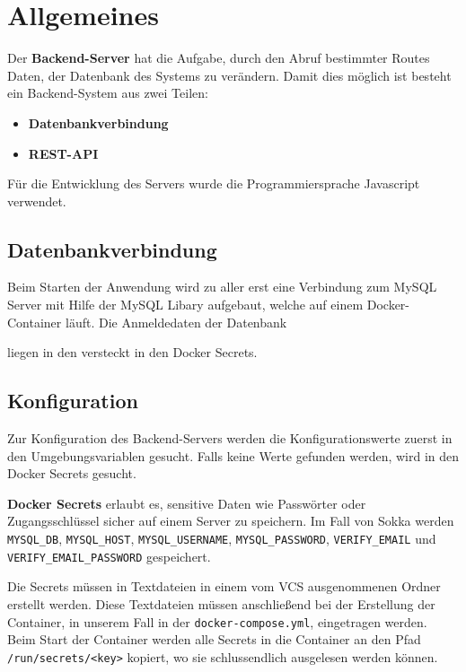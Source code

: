 \chapter{Allgemeines}

Der \textbf{Backend-Server} hat die Aufgabe, durch den Abruf bestimmter Routes Daten, der Datenbank des Systems zu verändern. Damit dies möglich ist besteht ein Backend-System aus zwei Teilen:

\begin{itemize}
    \item \textbf{Datenbankverbindung}
    \item \textbf{REST-API}
\end{itemize}

Für die Entwicklung des Servers wurde die Programmiersprache Javascript verwendet.

\section{Datenbankverbindung}

Beim Starten der Anwendung wird zu aller erst eine Verbindung zum MySQL Server mit Hilfe der MySQL Libary aufgebaut, welche auf einem Docker-Container läuft. Die Anmeldedaten der Datenbank

liegen in den versteckt in den Docker Secrets.



\section{Konfiguration}

Zur Konfiguration des Backend-Servers werden die Konfigurationswerte zuerst in den Umgebungsvariablen gesucht. Falls keine Werte gefunden werden, wird in den Docker Secrets gesucht.

\label{dockersecrets}

\textbf{Docker Secrets} erlaubt es, sensitive Daten wie Passwörter oder Zugangsschlüssel sicher auf einem Server zu speichern. Im Fall von Sokka werden \lstinline{MYSQL_DB}, \lstinline{MYSQL_HOST}, \lstinline{MYSQL_USERNAME}, \lstinline{MYSQL_PASSWORD}, \lstinline{VERIFY_EMAIL} und \lstinline{VERIFY_EMAIL_PASSWORD} gespeichert.

Die Secrets müssen in Textdateien in einem vom VCS ausgenommenen Ordner erstellt werden. Diese Textdateien müssen anschließend bei der Erstellung der Container, in unserem Fall in der \lstinline{docker-compose.yml}, eingetragen werden. Beim Start der Container werden alle Secrets in die Container an den Pfad \lstinline{/run/secrets/<key>} kopiert, wo sie schlussendlich ausgelesen werden können.


